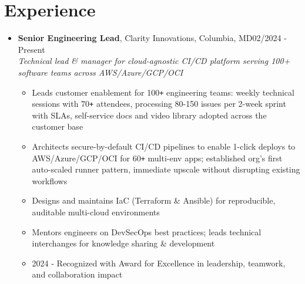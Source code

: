 \documentclass[10pt]{extarticle}
\begin{document}

\section{Experience} 
\begin{itemize}
    \itemsep0.2em
    \item \textbf{Senior Engineering Lead}, Clarity Innovations, Columbia, MD\hfill 02/2024 - Present \\ \emph{ Technical lead \& manager for cloud-agnostic CI/CD platform serving 100+ software teams across AWS/Azure/GCP/OCI}
    \begin{itemize}
        \itemsep0em
        \item Leads customer enablement for 100\verb!+! engineering teams: weekly technical sessions with 70\verb!+! attendees, processing 80-150 issues per 2-week sprint with SLAs, self-service docs and video library adopted across the customer base
        \item Architects secure-by-default CI/CD pipelines to enable 1-click deploys to AWS/Azure/GCP/OCI for 60\verb!+! multi-env apps; established org's first auto-scaled runner pattern, immediate upscale without disrupting existing workflows
        \item Designs and maintains IaC (Terraform \& Ansible) for reproducible, auditable multi-cloud environments
        \item Mentors engineers on DevSecOps best practices; leads technical interchanges for knowledge sharing \& development
        \item 2024 - Recognized with Award for Excellence in leadership, teamwork, and collaboration impact
    \end{itemize}
    

\end{itemize}
\end{document}
